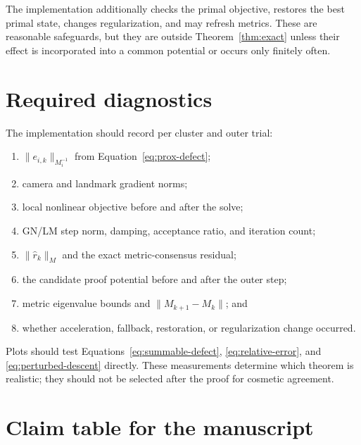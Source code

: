 \documentclass[11pt]{article}
\newcommand{\normM}[1]{\lVert #1\rVert_M}
\begin{document}
The implementation additionally checks the primal objective, restores the
best primal state, changes regularization, and may refresh metrics.  These are
reasonable safeguards, but they are outside Theorem~\ref{thm:exact} unless
their effect is incorporated into a common potential or occurs only finitely
often.

\section{Required diagnostics}

The implementation should record per cluster and outer trial:
\begin{enumerate}
  \item $\lVert e_{i,k}\rVert_{M_i^{-1}}$ from
        Equation~\eqref{eq:prox-defect};
  \item camera and landmark gradient norms;
  \item local nonlinear objective before and after the solve;
  \item GN/LM step norm, damping, acceptance ratio, and iteration count;
  \item $\normM{\widehat r_k}$ and the exact metric-consensus residual;
  \item the candidate proof potential before and after the outer step;
  \item metric eigenvalue bounds and $\lVert M_{k+1}-M_k\rVert$; and
  \item whether acceleration, fallback, restoration, or regularization change
        occurred.
\end{enumerate}

Plots should test Equations~\eqref{eq:summable-defect},
\eqref{eq:relative-error}, and \eqref{eq:perturbed-descent} directly.  These
measurements determine which theorem is realistic; they should not be selected
after the proof for cosmetic agreement.

\section{Claim table for the manuscript}
\end{document}
